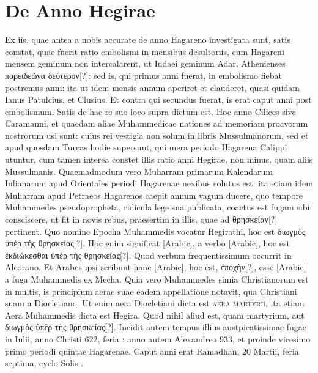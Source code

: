 \section{De Anno Hegirae}
%
Ex iis, quae antea a nobis accurate de anno Hagareno investigata
sunt, satis constat, quae fuerit ratio embolismi in mensibus desultoriis,
cum Hagareni mensem geminum non intercalarent, ut
Iudaei geminum Adar, Athenienses \textgreek{πορειδεῶνα δεύτερον[?]}: sed is, qui
primus anni fuerat, in embolismo fiebat postremus anni: ita ut idem
mensis annum aperiret et clauderet, quasi quidam Ianus Patulcius,
et Clusius.
Et contra qui secundus fuerat, is erat caput anni post
embolismum.
Satis de hac re suo loco supra dictum est.
Hoc anno Cilices
sive Caramanni, et quaedam aliae Muhammedicae nationes ad memoriam
proavorum nostrorum usi sunt: cuius rei vestigia non solum
in libris Mussulmanorum, sed et apud quosdam Turcas hodie supersunt,
qui mera periodo Hagarena Calippi utuntur, cum tamen
interea constet illis ratio anni Hegirae, non minus, quam aliis Mussulmanis.
%
Quaemadmodum vero Muharram primarum Kalendarum Iulianarum
apud Orientales periodi Hagarenae nexibus solutus est: ita
etiam idem Muharram apud Petraeos Hagarenos caepit annum vagum
ducere, quo tempore Muhammedes pseudopropheta, ridicula lege
sua publicata, coactus est fugam sibi consciscere, ut fit in novis rebus,
praesertim in illis, quae ad \textgreek{θρησκείαν[?]} pertinent.
Quo nomine Epocha
Muhammedis vocatur Hegirathi, hoc est \textgreek{διωγμὸς ὑπὲρ τὴς θρησκείας[?]}.
Hoc
enim significat \textarabic{[Arabic]}, a verbo \textarabic{[Arabic]},
 hoc est \textgreek{ἐκδιώκεσθαι ὑπὲρ τὴς θρησκείας[?]}.
Quod verbum frequentissimum occurrit in Alcorano.
Et Arabes ipsi
scribunt hanc \textarabic{[Arabic]}, hoc est, \textgreek{ἐποχὴν[?]},
 esse \textarabic{[Arabic]}
a fuga Muhammedis ex Mecha.
Quia vero Muhammedes simia Christianorum
est in multis, is principium aerae suae eadem appellatione notavit,
qua Christiani suam a Diocletiano.
Ut enim aera Diocletiani
dicta est \textsc{aera martyrii}, ita etiam Aera Muhammedis dicta est Hegira.
Quod nihil aliud est, quam martyrium, aut
 \textgreek{διωγμὸς ὑπὲρ τὴς θρησκείας[?]}.
Incidit autem tempus illius austpicatissimae fugae in  Iulii,
anno Christi 622, feria : anno autem Alexandreo 933, et proinde
vicesimo primo periodi quintae Hagarenae.
Caput anni erat Ramadhan,
20 Martii, feria septima, cyclo Solis .
